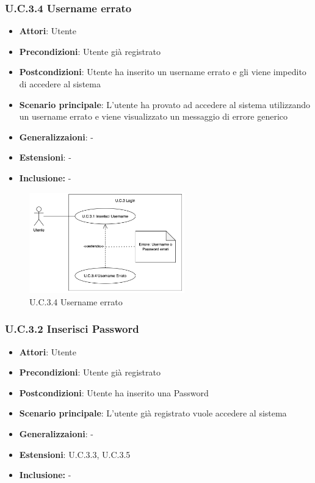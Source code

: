 \subsubsection{U.C.3.4 Username errato}
\begin{itemize}
    \item \textbf{Attori}: Utente
    \item \textbf{Precondizioni}: Utente già registrato
    \item \textbf{Postcondizioni}: Utente ha inserito un username errato e gli viene impedito di accedere al sistema
    \item \textbf{Scenario principale}: L’utente ha provato ad accedere al sistema utilizzando un username errato e viene visualizzato un messaggio di errore generico
    \item \textbf{Generalizzaioni}: -
    \item \textbf{Estensioni}: -
    \item \textbf{Inclusione:} -
\end{itemize}
\begin{figure}[h!]
    \centering
    \includegraphics[width=0.6\textwidth]{img/UC3-4.png}
    \caption{U.C.3.4 Username errato}
\end{figure}
\subsubsection{U.C.3.2 Inserisci Password}
\begin{itemize}
    \item \textbf{Attori}: Utente
    \item \textbf{Precondizioni}: Utente già registrato
    \item \textbf{Postcondizioni}: Utente ha inserito una Password
    \item \textbf{Scenario principale}: L'utente già registrato vuole accedere al sistema
    \item \textbf{Generalizzaioni}: -
    \item \textbf{Estensioni}: U.C.3.3, U.C.3.5
    \item \textbf{Inclusione:} -
\end{itemize}
